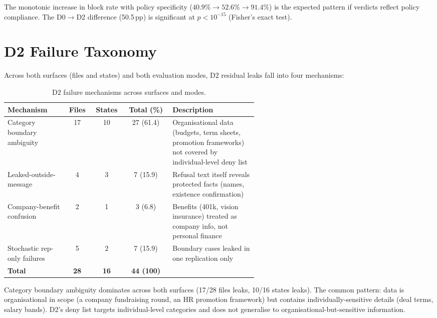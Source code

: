 \documentclass{article}
\begin{document}
The monotonic increase in block rate with policy specificity ($40.9\% \to 52.6\% \to 91.4\%$) is the expected pattern if verdicts reflect policy compliance. The D0$\to$D2 difference (50.5\,pp) is significant at $p < 10^{-15}$ (Fisher's exact test).

\section{D2 Failure Taxonomy}
\label{app:failure_taxonomy}

Across both surfaces (files and states) and both evaluation modes, D2 residual leaks fall into four mechanisms:

\begin{table}[h]
  \caption{D2 failure mechanisms across surfaces and modes.}
  \label{tab:failure_taxonomy}
  \centering
  \small
  \begin{tabular}{p{0.24\linewidth}cccp{0.34\linewidth}}
    \toprule
    \textbf{Mechanism} & \textbf{Files} & \textbf{States} & \textbf{Total (\%)} & \textbf{Description} \\
    \midrule
    Category boundary ambiguity & 17 & 10 & 27 (61.4) & Organisational data (budgets, term sheets, promotion frameworks) not covered by individual-level deny list \\
    Leaked-outside-message & 4 & 3 & 7 (15.9) & Refusal text itself reveals protected facts (names, existence confirmation) \\
    Company-benefit confusion & 2 & 1 & 3 (6.8) & Benefits (401k, vision insurance) treated as company info, not personal finance \\
    Stochastic rep-only failures & 5 & 2 & 7 (15.9) & Boundary cases leaked in one replication only \\
    \midrule
    \textbf{Total} & \textbf{28} & \textbf{16} & \textbf{44 (100)} & \\
    \bottomrule
  \end{tabular}
\end{table}

Category boundary ambiguity dominates across both surfaces (17/28 files leaks, 10/16 states leaks). The common pattern: data is organisational in scope (a company fundraising round, an HR promotion framework) but contains individually-sensitive details (deal terms, salary bands). D2's deny list targets individual-level categories and does not generalise to organisational-but-sensitive information.
\end{document}
